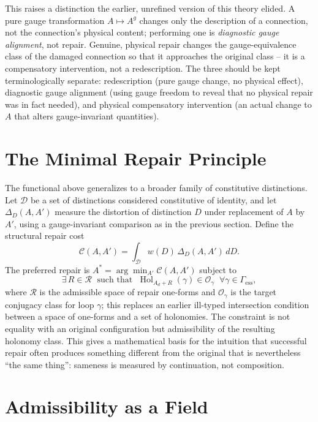 \documentclass[11pt]{article}
\newcommand{\Hol}{\operatorname{Hol}}
\begin{document}
This raises a distinction the earlier, unrefined version of this theory elided. A pure gauge transformation $A \mapsto A^g$ changes only the description of a connection, not the connection's physical content; performing one is \emph{diagnostic gauge alignment}, not repair. Genuine, physical repair changes the gauge-equivalence class of the damaged connection so that it approaches the original class -- it is a compensatory intervention, not a redescription. The three should be kept terminologically separate: redescription (pure gauge change, no physical effect), diagnostic gauge alignment (using gauge freedom to reveal that no physical repair was in fact needed), and physical compensatory intervention (an actual change to $A$ that alters gauge-invariant quantities).

\section{The Minimal Repair Principle}

The functional above generalizes to a broader family of constitutive distinctions. Let $\mathcal{D}$ be a set of distinctions considered constitutive of identity, and let $\Delta_D(A, A')$ measure the distortion of distinction $D$ under replacement of $A$ by $A'$, using a gauge-invariant comparison as in the previous section. Define the structural repair cost
\[
\mathcal{C}(A, A') = \int_{\mathcal{D}} w(D)\, \Delta_D(A, A')\, dD.
\]
The preferred repair is $A^\ast = \arg\min_{A'} \mathcal{C}(A, A')$ subject to
\[
\exists\, R \in \mathcal{R} \; \text{ such that } \; \Hol_{A_d + R}(\gamma) \in \mathcal{O}_\gamma \; \; \forall \gamma \in \Gamma_{\mathrm{ess}},
\]
where $\mathcal{R}$ is the admissible space of repair one-forms and $\mathcal{O}_\gamma$ is the target conjugacy class for loop $\gamma$; this replaces an earlier ill-typed intersection condition between a space of one-forms and a set of holonomies. The constraint is not equality with an original configuration but admissibility of the resulting holonomy class. This gives a mathematical basis for the intuition that successful repair often produces something different from the original that is nevertheless ``the same thing'': sameness is measured by continuation, not composition.

\section{Admissibility as a Field}
\end{document}
